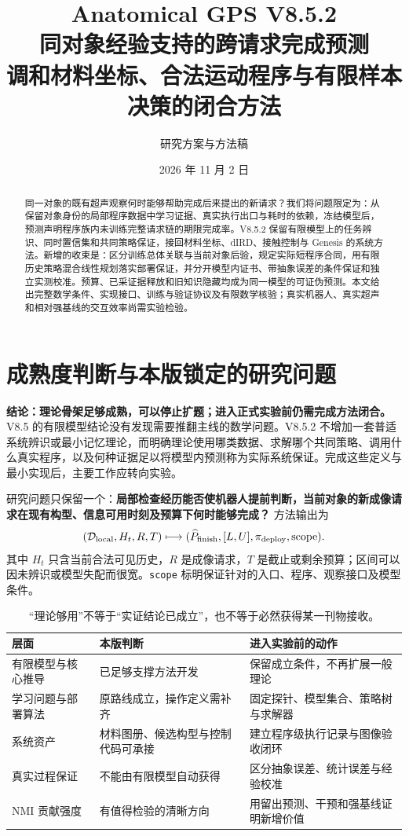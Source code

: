 \documentclass[11pt,a4paper,fontset=fandol]{ctexart}
\title{\color{ink}\bfseries Anatomical GPS V8.5.2\\[0.3em]
\LARGE 同对象经验支持的跨请求完成预测\\[0.35em]
\large 调和材料坐标、合法运动程序与有限样本决策的闭合方法}
\author{研究方案与方法稿}
\date{2026 年 11 月 2 日}
\theoremstyle{definition}\newtheorem{definition}[theorem]{定义}
\theoremstyle{remark}\newtheorem{remark}[theorem]{说明}
\numberwithin{equation}{section}
\begin{document}
\maketitle
\begin{abstract}
同一对象的既有超声观察何时能够帮助完成后来提出的新请求？我们将问题限定为：从保留对象身份的局部程序数据中学习证据、真实执行出口与耗时的依赖，冻结模型后，预测声明程序族内未训练完整请求链的期限完成率。V8.5.2 保留有限模型上的任务辨识、同时置信集和共同策略保证，接回材料坐标、dIRD、接触控制与 Genesis 的系统方法。新增的收束是：区分训练总体关联与当前对象后验，规定实际短程序合同，用有限历史策略混合线性规划落实部署保证，并分开模型内证书、带抽象误差的条件保证和独立实测校准。预算、已采证据释放和旧知识隐藏均成为同一模型的可证伪预测。本文给出完整数学条件、实现接口、训练与验证协议及有限数学核验；真实机器人、真实超声和相对强基线的交互效率尚需实验检验。
\end{abstract}

\section{成熟度判断与本版锁定的研究问题}
\label{sec:decision}
\begin{corebox}
\textbf{结论：理论骨架足够成熟，可以停止扩题；进入正式实验前仍需完成方法闭合。}
V8.5 的有限模型结论没有发现需要推翻主线的数学问题。V8.5.2 不增加一套普适系统辨识或最小记忆理论，而明确理论使用哪类数据、求解哪个共同策略、调用什么真实程序，以及何种证据足以将模型内预测称为实际系统保证。完成这些定义与最小实现后，主要工作应转向实验。
\end{corebox}

研究问题只保留一个：\textbf{局部检查经历能否使机器人提前判断，当前对象的新成像请求在现有构型、信息可用时刻及预算下何时能够完成？} 方法输出为
\begin{equation}
 (\mathcal D_{\rm local},H_t,R,T)\longmapsto
 (\widehat P_{\rm finish},[L,U],\pi_{\rm deploy},\mathrm{scope}).
 \label{eq:product}
\end{equation}
其中 $H_t$ 只含当前合法可见历史，$R$ 是成像请求，$T$ 是截止或剩余预算；区间可以因未辨识或模型失配而很宽。\texttt{scope} 标明保证针对的入口、程序、观察接口及模型条件。

\begin{table}[htbp]\centering\small
\begin{tabularx}{\linewidth}{P{.20\linewidth}YY}\toprule
层面 & 本版判断 & 进入实验前的动作\\\midrule
有限模型与核心推导 & 已足够支撑方法开发 & 保留成立条件，不再扩展一般理论\\
学习问题与部署算法 & 原路线成立，操作定义需补齐 & 固定探针、模型集合、策略树与求解器\\
系统资产 & 材料图册、候选构型与控制代码可承接 & 建立程序级执行记录与图像验收闭环\\
真实过程保证 & 不能由有限模型自动获得 & 区分抽象误差、统计误差与经验校准\\
NMI 贡献强度 & 有值得检验的清晰方向 & 用留出预测、干预和强基线证明新增价值\\\bottomrule
\end{tabularx}
\caption{“理论够用”不等于“实证结论已成立”，也不等于必然获得某一刊物接收。}
\end{table}
\end{document}

